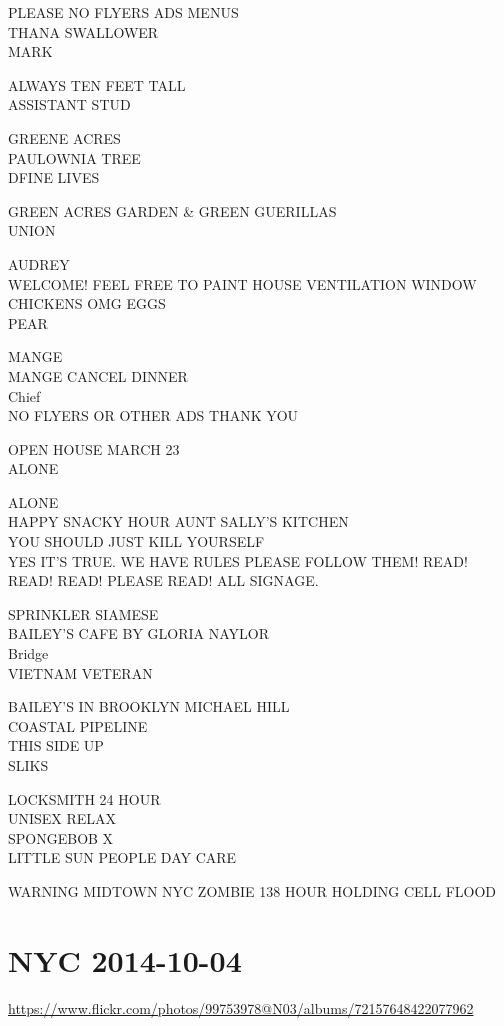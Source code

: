 \documentclass[10pt,letterpaper]{article}
\begin{document}
PLEASE NO FLYERS ADS MENUS\\
THANA SWALLOWER\\
MARK

ALWAYS TEN FEET TALL\\
ASSISTANT STUD

GREENE ACRES\\
PAULOWNIA TREE\\
DFINE LIVES

GREEN ACRES GARDEN \& GREEN GUERILLAS\\
UNION

AUDREY\\
WELCOME!  FEEL FREE TO PAINT HOUSE  VENTILATION WINDOW\\
CHICKENS OMG EGGS\\
PEAR

MANGE\\
MANGE CANCEL DINNER\\
Chief\\
NO FLYERS OR OTHER ADS THANK YOU

OPEN HOUSE MARCH 23\\
ALONE

ALONE\\
HAPPY SNACKY HOUR AUNT SALLY'S KITCHEN\\
YOU SHOULD JUST KILL YOURSELF\\
YES IT'S TRUE.  WE HAVE RULES PLEASE FOLLOW THEM!  READ! READ! READ! PLEASE READ! ALL SIGNAGE.

SPRINKLER SIAMESE\\
BAILEY'S CAFE BY GLORIA NAYLOR\\
Bridge\\
VIETNAM VETERAN

BAILEY'S IN BROOKLYN MICHAEL HILL\\
COASTAL PIPELINE\\
THIS SIDE UP\\
SLIKS

LOCKSMITH 24 HOUR\\
UNISEX RELAX\\
SPONGEBOB X\\
LITTLE SUN PEOPLE DAY CARE

WARNING MIDTOWN NYC ZOMBIE 138 HOUR HOLDING CELL FLOOD
\pagebreak

\section*{NYC 2014-10-04}

\url{https://www.flickr.com/photos/99753978@N03/albums/72157648422077962}
\end{document}
